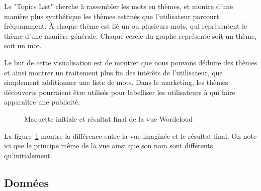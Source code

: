		Le "Topics List" cherche à rassembler les mots en thèmes, et montre d'une manière plus synthétique les thèmes estimés que l'utilisateur parcourt fréquamment. À chaque thème est lié un ou plusieurs mots, qui reprèsentent le thème d'une manière générale. Chaque cercle du graphe représente soit un thème, soit un mot.

		Le but de cette visualisation est de montrer que nous pouvons déduire des thèmes et ainsi montrer un traitement plus fin des intérêts de l'utilisateur, que simplement additionner une liste de mots. Dans le marketing, les thèmes découverts pourraient être utilisés pour labelliser les utilisateurs à qui faire apparaître une publicité.

		\begin{figure}[!h]
			\centering
			\caption{Maquette initiale et résultat final de la vue Wordcloud}
			\label{topics_images}
		\end{figure}

		La figure~\ref{topics_images} montre la différence entre la vue imaginée et le résultat final. On note ici que le principe même de la vue ainsi que son nom sont différents qu'initialement.

	\subsection{Données}


